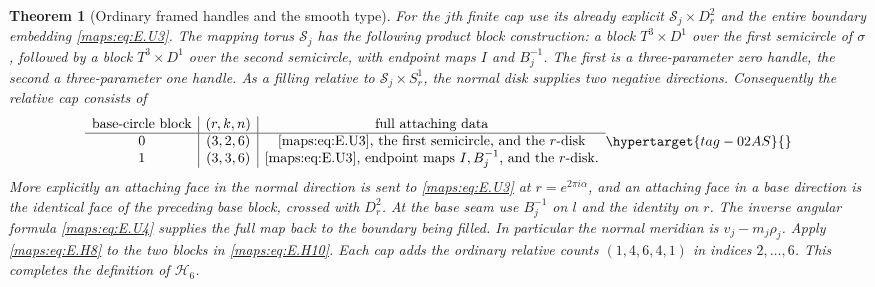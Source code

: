 \documentclass[11pt,a4paper]{article}
\numberwithin{equation}{section}
\newtheorem{theorem}{Theorem}[section]
\theoremstyle{definition}
\begin{document}
\begin{theorem}[Ordinary framed handles and the smooth type]
For the $j$th finite cap use its already explicit
$\mathcal S_j\times D^2_r$ and the entire boundary embedding
\eqref{maps:eq:E.U3}.  The mapping torus $\mathcal S_j$ has the following product
block construction: a block $T^3\times D^1$ over the first
semicircle of $\sigma$, followed by a block $T^3\times D^1$ over
the second semicircle, with endpoint maps $I$ and $B_j^{-1}$.
The first is a three-parameter zero handle, the second a
three-parameter one handle.  As a filling relative to
$\mathcal S_j\times S^1_r$, the normal disk supplies two negative
directions.  Consequently the relative cap consists of
\begin{equation}
 \begin{array}{c|c|c}
 \hbox{base-circle block}&(r,k,n)&\hbox{full attaching data}\\ \hline
 0&(3,2,6)&\hbox{\eqref{maps:eq:E.U3}, the first semicircle, and the $r$-disk}\\
 1&(3,3,6)&\hbox{\eqref{maps:eq:E.U3}, endpoint maps $I,B_j^{-1}$, and the $r$-disk}.
 \end{array}
 \hypertarget{tag-02AS}{}\label{maps:eq:E.H10}
\end{equation}
More explicitly an attaching face in the normal direction is sent
to \eqref{maps:eq:E.U3} at $r=e^{2\pi i\alpha}$, and an attaching face in a
base direction is the identical face of the preceding base block,
crossed with $D^2_r$.  At the base seam use $B_j^{-1}$ on $l$ and
the identity on $r$.  The inverse angular formula \eqref{maps:eq:E.U4} supplies
the full map back to the boundary being filled.  In particular
the normal meridian is $v_j-m_j\rho_j$.
Apply \eqref{maps:eq:E.H8} to the two blocks in \eqref{maps:eq:E.H10}.  Each cap adds the
ordinary relative counts $(1,4,6,4,1)$ in indices $2,\ldots,6$.
This completes the definition of $\mathcal H_6$.


\end{theorem}
\end{document}
